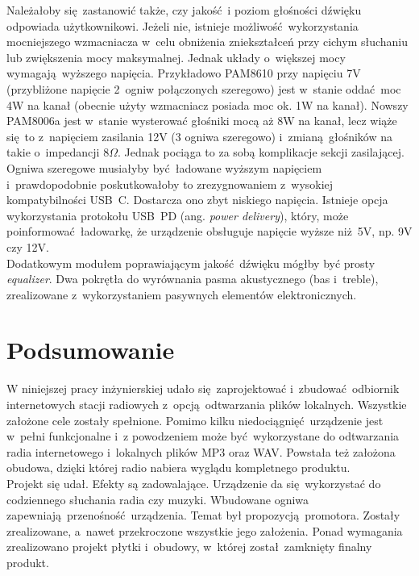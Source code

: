 \documentclass[polish]{aghengthesis}
\begin{document}
			Należałoby się zastanowić także, czy jakość i poziom głośności dźwięku odpowiada użytkownikowi. Jeżeli nie, istnieje możliwość wykorzystania mocniejszego wzmacniacza w~celu obniżenia zniekształceń przy cichym słuchaniu lub zwiększenia mocy maksymalnej. Jednak układy o~większej mocy wymagają wyższego napięcia.
			Przykładowo PAM8610\textsuperscript{\cite{ch5_pam8610}} przy napięciu 7V (przybliżone napięcie 2~ogniw połączonych szeregowo) jest w~stanie oddać moc 4W na kanał (obecnie użyty wzmacniacz posiada moc ok. 1W na kanał). Nowszy PAM8006a\textsuperscript{\cite{ch5_pam8006a}} jest w~stanie wysterować głośniki mocą aż 8W na kanał, lecz wiąże się to z~napięciem zasilania 12V (3 ogniwa szeregowo) i~zmianą głośników na takie o~impedancji $8 \Omega$.
			Jednak pociąga to za sobą komplikacje sekcji zasilającej. Ogniwa szeregowe musiałyby być ładowane wyższym napięciem i~prawdopodobnie poskutkowałoby to zrezygnowaniem z~wysokiej kompatybilności USB~C. Dostarcza ono zbyt niskiego napięcia. Istnieje opcja wykorzystania protokołu USB~PD (ang. \textit{power delivery}), który, może poinformować ładowarkę, że urządzenie obsługuje napięcie wyższe niż 5V, np. 9V czy 12V.
			$ $\\
			
			Dodatkowym modułem poprawiającym jakość dźwięku mógłby być prosty \textit{equalizer}. Dwa pokrętła do wyrównania pasma akustycznego (bas i~treble), zrealizowane z~wykorzystaniem pasywnych elementów elektronicznych.
			
	\section{Podsumowanie}
	
		W niniejszej pracy inżynierskiej udało się zaprojektować i~zbudować odbiornik internetowych stacji radiowych z~opcją odtwarzania plików lokalnych.
		Wszystkie założone cele zostały spełnione. Pomimo kilku niedociągnięć urządzenie jest w~pełni funkcjonalne i~z powodzeniem może być wykorzystane do odtwarzania radia internetowego i~lokalnych plików MP3 oraz WAV. Powstała też założona obudowa, dzięki której radio nabiera wyglądu kompletnego produktu.
		$ $\\
		
		Projekt się udał. Efekty są zadowalające. Urządzenie da się wykorzystać do codziennego słuchania radia czy muzyki. Wbudowane ogniwa zapewniają przenośność urządzenia.
		Temat był propozycją promotora.
		Zostały zrealizowane, a~nawet przekroczone wszystkie jego założenia. Ponad wymagania zrealizowano projekt płytki i~obudowy, w~której został zamknięty finalny produkt.
		$ $\\
		
\end{document}

